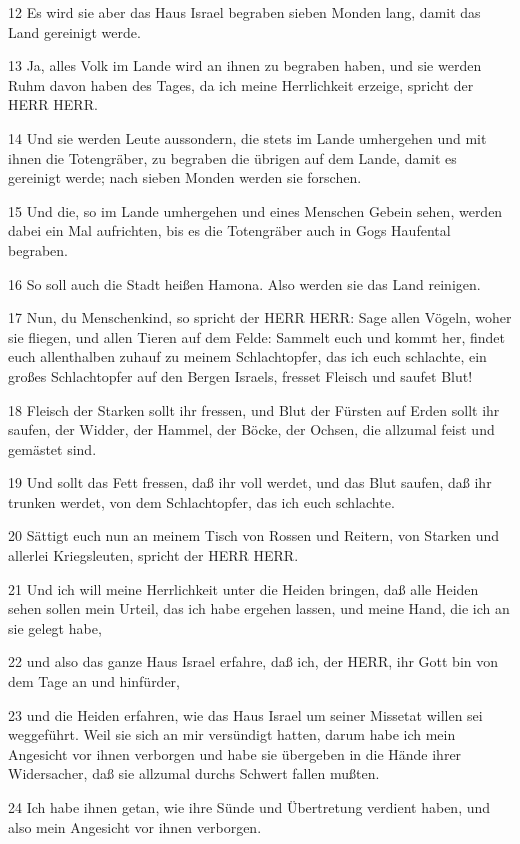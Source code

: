\par 12 Es wird sie aber das Haus Israel begraben sieben Monden lang, damit das Land gereinigt werde.
\par 13 Ja, alles Volk im Lande wird an ihnen zu begraben haben, und sie werden Ruhm davon haben des Tages, da ich meine Herrlichkeit erzeige, spricht der HERR HERR.
\par 14 Und sie werden Leute aussondern, die stets im Lande umhergehen und mit ihnen die Totengräber, zu begraben die übrigen auf dem Lande, damit es gereinigt werde; nach sieben Monden werden sie forschen.
\par 15 Und die, so im Lande umhergehen und eines Menschen Gebein sehen, werden dabei ein Mal aufrichten, bis es die Totengräber auch in Gogs Haufental begraben.
\par 16 So soll auch die Stadt heißen Hamona. Also werden sie das Land reinigen.
\par 17 Nun, du Menschenkind, so spricht der HERR HERR: Sage allen Vögeln, woher sie fliegen, und allen Tieren auf dem Felde: Sammelt euch und kommt her, findet euch allenthalben zuhauf zu meinem Schlachtopfer, das ich euch schlachte, ein großes Schlachtopfer auf den Bergen Israels, fresset Fleisch und saufet Blut!
\par 18 Fleisch der Starken sollt ihr fressen, und Blut der Fürsten auf Erden sollt ihr saufen, der Widder, der Hammel, der Böcke, der Ochsen, die allzumal feist und gemästet sind.
\par 19 Und sollt das Fett fressen, daß ihr voll werdet, und das Blut saufen, daß ihr trunken werdet, von dem Schlachtopfer, das ich euch schlachte.
\par 20 Sättigt euch nun an meinem Tisch von Rossen und Reitern, von Starken und allerlei Kriegsleuten, spricht der HERR HERR.
\par 21 Und ich will meine Herrlichkeit unter die Heiden bringen, daß alle Heiden sehen sollen mein Urteil, das ich habe ergehen lassen, und meine Hand, die ich an sie gelegt habe,
\par 22 und also das ganze Haus Israel erfahre, daß ich, der HERR, ihr Gott bin von dem Tage an und hinfürder,
\par 23 und die Heiden erfahren, wie das Haus Israel um seiner Missetat willen sei weggeführt. Weil sie sich an mir versündigt hatten, darum habe ich mein Angesicht vor ihnen verborgen und habe sie übergeben in die Hände ihrer Widersacher, daß sie allzumal durchs Schwert fallen mußten.
\par 24 Ich habe ihnen getan, wie ihre Sünde und Übertretung verdient haben, und also mein Angesicht vor ihnen verborgen.
